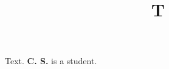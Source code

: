 \documentclass{cas-sc}
\begin{document}
\title[mode=title]{T}
\maketitle
Text.
\textbf{C. S.} is a student.
\endbio
\end{document}
